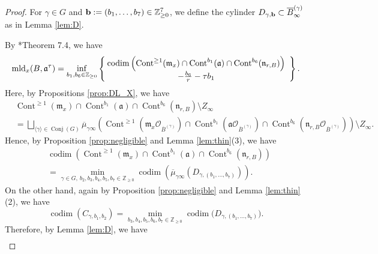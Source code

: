 \documentclass[a4paper,11pt]{amsart}
\theoremstyle{definition}
\theoremstyle{remark}
\begin{document}
\begin{proof}
For $\gamma \in G$ and ${\bf b} := (b_1, \ldots, b_7) \in \mathbb{Z}_{\ge 0} ^7$, 
we define the cylinder $D_{\gamma, {\bf b}} \subset \overline{B}^{(\gamma)}_{\infty}$ as in Lemma \ref{lem:D}. 

By \cite{EM09}*{Theorem 7.4}, we have
\[
\operatorname{mld}_x(B,\mathfrak{a}^{\tau})=
\inf _{b_1, b_6 \in \mathbb{Z}_{\ge 0}} 
\left\{\hspace{-1mm}  \begin{array}{c} 
\operatorname{codim} \left( 
\operatorname{Cont}^{\ge 1}(\mathfrak m_x)
\cap \operatorname{Cont}^{b_1} (\mathfrak a) 
\cap \operatorname{Cont}^{b_6}(\mathfrak n_{r,B}) 
\right) \\
-\frac{b_6}{r} - \tau b_1
\end{array}
\right\}.
\]
Here, by Propositions \ref{prop:DL_X}, we have
\begin{align*}
&\operatorname{Cont}^{\ge 1}(\mathfrak m_x) \cap
\operatorname{Cont}^{b_1}(\mathfrak a) \cap 
\operatorname{Cont}^{b_6}(\mathfrak n_{r,B})  \setminus Z_\infty \\
&{}= \bigsqcup _{\langle \gamma \rangle \in \operatorname{Conj}(G)} 
\overline{\mu}_{\gamma \infty} \left( 
\operatorname{Cont}^{\ge 1} \left( \mathfrak{m}_x \mathcal{O}_{\overline{B}^{(\gamma)}} \right) \cap
\operatorname{Cont}^{b_1} \left( \mathfrak{a} \mathcal{O}_{\overline{B}^{(\gamma)}} \right) \cap 
\operatorname{Cont}^{b_6} \left( \mathfrak{n}_{r,B} \mathcal{O}_{\overline{B}^{(\gamma)}} \right) \right) \setminus Z_\infty. 
\end{align*}
Hence, by Proposition \ref{prop:negligible} and Lemma \ref{lem:thin}(3), we have 
\begin{align*}
& \operatorname{codim} \left( \operatorname{Cont}^{\ge 1}(\mathfrak m_x) \cap
\operatorname{Cont}^{b_1}(\mathfrak a) \cap 
\operatorname{Cont}^{b_6}(\mathfrak n_{r,B}) \right) \\
& =
\min_{\gamma \in G,\ b_2, b_3, b_4, b_5, b_7 \in \mathbb{Z}_{\ge 0}} \operatorname{codim} 
\left( \overline{\mu}_{\gamma \infty} ( D_{\gamma, (b_1, \ldots , b_7)} ) \right). 
\end{align*}
 On the other hand, again by Proposition \ref{prop:negligible} and Lemma \ref{lem:thin}(2), we have 
\[
\operatorname{codim} (C_{\gamma, b_1 , b_2}) = 
\min_{b_3, b_4, b_5, b_6, b_7 \in \mathbb{Z}_{\ge 0}} \operatorname{codim} \bigl( D_{\gamma, (b_1, \ldots , b_7)} \bigr).
\]
Therefore, by Lemma \ref{lem:D}, we have
\begin{align*}

\end{align*}
\end{proof}
\end{document}
